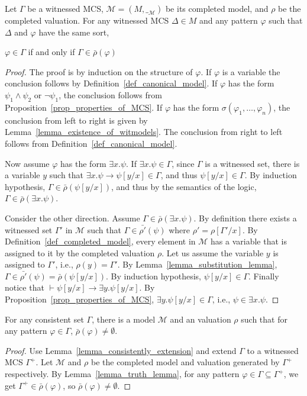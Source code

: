 \documentclass[acmsmall]{acmart}
\theoremstyle{acmdefinition}
\newcommand{\imp}{\to}
\newcommand{\eGamma}{\Gamma^+}
\newcommand{\MM}{\mathcal{M}}
\newcommand{\interp}[1]{\__{#1}}
\newcommand{\interpM}{\interp{\MM}}
\newcommand{\barrho}{\bar{\rho}}
\newcommand{\ddd}{,\dots,}
\begin{document}
\begin{lemma}
\label{lemma_truth_lemma}
Let $\Gamma$ be a witnessed MCS,
$\MM = (M, \interpM)$ be its completed model,
and $\rho$ be the completed valuation.
For any witnessed MCS $\Delta \in M$
and any pattern $\varphi$
such that $\Delta$ and $\varphi$ have the same sort,
\begin{center}
$\varphi \in \Gamma$ 
\quad if and only if \quad
$\Gamma \in \barrho(\varphi)$
\end{center}
\end{lemma}
\begin{proof}
The proof is by induction on the structure of $\varphi$.
If $\varphi$ is a variable
the conclusion follows by Definition~\ref{def_canonical_model}.
If $\varphi$ has the form $\psi_1 \wedge \psi_2$
or $\neg \psi_1$, the conclusion follows from 
Proposition~\ref{prop_properties_of_MCS}.
If $\varphi$ has the form $\sigma(\varphi_1 \ddd \varphi_n)$,
the conclusion from left to right is given by 
Lemma~\ref{lemma_existence_of_witmodels}.
The conclusion from right to left follows from
Definition~\ref{def_canonical_model}.

Now assume $\varphi$ has the form $\exists x . \psi$.
If $\exists x . \psi \in \Gamma$,
since $\Gamma$ is a witnessed set, there is a variable $y$ such that
$\exists x . \psi \imp \psi[y / x] \in \Gamma$,
and thus $\psi[y / x] \in \Gamma$.
By induction hypothesis,
$\Gamma \in \barrho(\psi[y / x])$,
and thus by the semantics of the logic,
$\Gamma \in \barrho(\exists x . \psi)$.

Consider the other direction. Assume $\Gamma \in \barrho(\exists x .\psi)$.
By definition there exists a witnessed set $\Gamma'$ in $\MM$ such that
$\Gamma \in \bar{\rho'}(\psi)$ where $\rho' = \rho[\Gamma' / x]$.
By Definition~\ref{def_completed_model},
every element in $\MM$ has a variable that is assigned to it by the 
completed valuation $\rho$.
Let us assume the variable $y$ is assigned to $\Gamma'$, i.e.,
$\rho(y) = \Gamma'$.
By Lemma~\ref{lemma_substitution_lemma},
$\Gamma \in \bar{\rho'}(\psi) = \barrho(\psi[y/x])$.
By induction hypothesis,
$\psi[y/x] \in \Gamma$.
Finally notice that $\vdash \psi[y/x] \imp \exists y . \psi[y/x]$.
By Proposition~\ref{prop_properties_of_MCS},
$\exists y . \psi[y/x] \in \Gamma$, i.e., $\psi \in \exists x . \psi$.

\end{proof}

\begin{theorem}
\label{thm_consistent_sets_have_models}
For any consistent set $\Gamma$,
there is a model $\MM$ and an valuation $\rho$ such that
for any pattern $\varphi \in \Gamma$, $\barrho(\varphi) \neq \emptyset$.
\end{theorem}
\begin{proof}
Use Lemma~\ref{lemma_consistently_extension} and extend $\Gamma$ to a
witnessed MCS $\eGamma$.
Let $\MM$ and $\rho$ be the completed model and valuation generated by
$\eGamma$ respectively.
By Lemma~\ref{lemma_truth_lemma}, 
for any pattern $\varphi \in \Gamma \subseteq \eGamma$, 
we get $\eGamma \in \barrho(\varphi)$,
so $\barrho(\varphi) \neq \emptyset$.
\end{proof}
\end{document}
